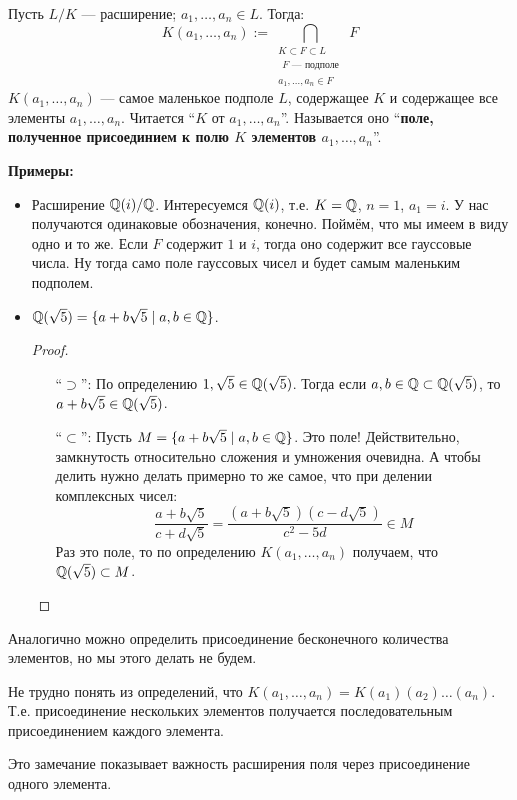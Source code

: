 \begin{conj}
    Пусть $L / K$ --- расширение; $a_1, \dots, a_n \in L$.
    Тогда:
    $$ K(a_1, \dots, a_n) := \bigcap_{\substack{K \subset F \subset L \\ \substack{F \text{ --- подполе}} \\ a_1, \dots, a_n \in F}} F $$
    $K(a_1, \dots, a_n)$ --- самое маленькое подполе $L$, содержащее $K$ и содержащее все элементы $a_1, \dots, a_n$. Читается ``$K$ от $a_1, \dots, a_n$''. Называется оно ``\textbf{поле, полученное присоединием к полю $K$ элементов $a_1, \dots, a_n$}''.
\end{conj}
\textbf{Примеры:} 
\begin{itemize}
    \item Расширение $\mathbb{Q}(i) / \mathbb{Q}$. Интересуемся $\mathbb{Q}(i)$, т.е. $K = \mathbb{Q}$, $n = 1$, $a_1 = i$. У нас получаются одинаковые обозначения, конечно. Поймём, что мы имеем в виду одно и то же. Если $F$ содержит $1$ и $i$, тогда оно содержит все гауссовые числа. Ну тогда само поле гауссовых чисел и будет самым маленьким подполем.

    \item $\mathbb{Q}(\sqrt{5}) = \{ a + b \sqrt{5} \mid a, b \in \mathbb{Q} \}$.
    \begin{proof} $ $
        \begin{itemize}
            \item[``$\supset$'':] По определению $1, \sqrt{5} \in \mathbb{Q}(\sqrt{5})$. Тогда если $a, b \in \mathbb{Q} \subset \mathbb{Q}(\sqrt{5})$, то $a + b \sqrt{5} \in \mathbb{Q}(\sqrt{5})$.
             
            \item[``$\subset$'':] Пусть $M = \{ a + b \sqrt{5} \mid a, b \in \mathbb{Q} \}$. Это поле! Действительно, замкнутость относительно сложения и умножения очевидна. А чтобы делить нужно делать примерно то же самое, что при делении комплексных чисел:
            $$ \frac{a + b\sqrt{5}}{c + d\sqrt{5}} = \frac{(a + b\sqrt{5})(c - d\sqrt{5})}{c^2 - 5d} \in M $$
            Раз это поле, то по определению $K(a_1, \dots, a_n)$ получаем, что $\mathbb{Q}(\sqrt{5}) \subset M$.
        \end{itemize}
    \end{proof}
\end{itemize}

\notice Аналогично можно определить присоединение бесконечного количества элементов, но мы этого делать не будем.

\notice Не трудно понять из определений, что $K(a_1, \dots, a_n) = K(a_1)(a_2)\dots(a_n)$. Т.е. присоединение нескольких элементов получается последовательным присоединением каждого элемента.

Это замечание показывает важность расширения поля через присоединение одного элемента.